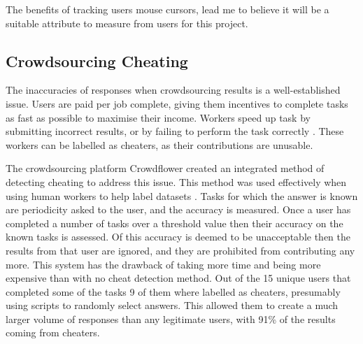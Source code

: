 \documentclass{article}
\begin{document}
The benefits of tracking users mouse cursors, lead me to believe it will be a suitable attribute to measure from users for this project. 


\subsection{Crowdsourcing Cheating}



The inaccuracies of responses when crowdsourcing results is a well-established issue.
Users are paid per job complete, giving them incentives to complete tasks as fast as possible to maximise their income.
Workers speed up task by submitting incorrect results, or by failing to perform the task correctly \cite{hirth2013analyzing}.
These workers can be labelled as cheaters, as their contributions are unusable.


The crowdsourcing platform Crowdflower created an integrated method of detecting cheating to address this issue.
This method was used effectively when using human workers to help label datasets \cite{quinn2010crowdflow}.
Tasks for which the answer is known are periodicity asked to the user, and the accuracy is measured.
Once a user has completed a number of tasks over a threshold value then their accuracy on the known tasks is assessed.
Of this accuracy is deemed to be unacceptable then the results from that user are ignored, and they are prohibited from contributing any more.
This system has the drawback of taking more time and being more expensive than with no cheat detection method.
Out of the 15 unique users that completed some of the tasks 9 of them where labelled as cheaters, presumably using scripts to randomly select answers.
This allowed them to create a much larger volume of responses than any legitimate users, with 91\% of the results coming from cheaters.
\end{document}
